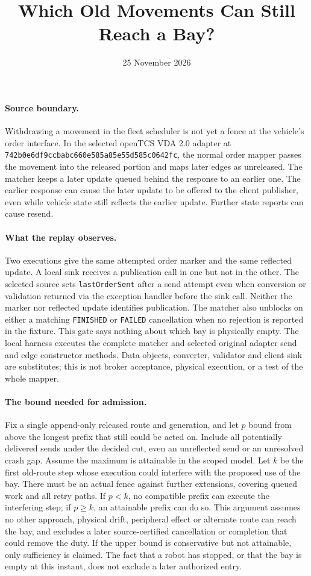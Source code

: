 \documentclass[11pt]{article}
\title{Which Old Movements Can Still Reach a Bay?}
\date{25 November 2026}
\begin{document}
\maketitle
\paragraph{Source boundary.}
Withdrawing a movement in the fleet scheduler is not yet a fence at the
vehicle's order interface. In the selected openTCS VDA 2.0 adapter at
\texttt{742b0e6df9ccbabc660e585a85e55d585c0642fc}, the normal order mapper
passes the movement into the released portion and maps later edges as
unreleased. The matcher keeps a later update queued behind the response
to an earlier one. The earlier response can cause the later update to be
offered to the client publisher, even while vehicle state still reflects
the earlier update. Further state reports can cause resend.

\paragraph{What the replay observes.}
Two executions give the same attempted order marker and the same
reflected update. A local sink receives a publication call in one but not
in the other. The selected source sets \texttt{lastOrderSent} after a send
attempt even when conversion or validation returned via the exception
handler before the sink call. Neither the marker nor reflected update
identifies publication. The matcher also unblocks on either a matching
\texttt{FINISHED} or \texttt{FAILED} cancellation when no rejection is
reported in the fixture. This gate says nothing about which bay is
physically empty. The local harness executes the complete matcher and
selected original adapter send and edge constructor methods. Data
objects, converter, validator and client sink are substitutes; this is
not broker acceptance, physical execution, or a test of the whole mapper.

\paragraph{The bound needed for admission.}
Fix a single append-only released route and generation, and let $p$
bound from above the longest prefix that still could be acted on. Include
all potentially delivered sends under the decided cut, even an
unreflected send or an unresolved crash gap. Assume the maximum is
attainable in the scoped model. Let $k$ be the first old-route step
whose execution could interfere with the proposed use of the bay.
There must be an actual fence against further extensions, covering
queued work and all retry paths. If $p<k$, no compatible prefix can
execute the interfering step; if $p\ge k$, an attainable prefix can do so.
This argument assumes no other approach, physical drift, peripheral
effect or alternate route can reach the bay, and excludes a later
source-certified cancellation or completion that could remove the duty.
If the upper bound is conservative but not attainable, only sufficiency
is claimed. The fact that a robot has stopped, or that the bay is empty
at this instant, does not exclude a later authorized entry.
\end{document}
